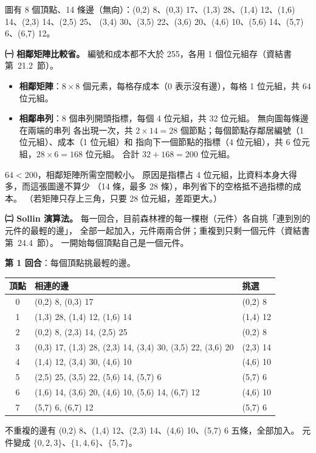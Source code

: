\begin{pastsoln}
圖有 8 個頂點、14 條邊（無向）：(0,2) 8、(0,3) 17、(1,3) 28、(1,4) 12、(1,6) 14、(2,3) 14、(2,5) 25、
(3,4) 30、(3,5) 22、(3,6) 20、(4,6) 10、(5,6) 14、(5,7) 6、(6,7) 12。

\textbf{㈠ 相鄰矩陣比較省。} 編號和成本都不大於 255，各用 1 個位元組存（資結書第~21.2~節）。
\begin{itemize}
\item \textbf{相鄰矩陣}：$8 \times 8$ 個元素，每格存成本（0 表示沒有邊），每格 1 位元組，共
$64$ 位元組。
\item \textbf{相鄰串列}：8 個串列開頭指標，每個 4 位元組，共 32 位元組。 無向圖每條邊在兩端的串列
各出現一次，共 $2 \times 14 = 28$ 個節點；每個節點存鄰居編號（1 位元組）、成本（1 位元組）和
指向下一個節點的指標（4 位元組），共 6 位元組，$28 \times 6 = 168$ 位元組。 合計 $32 + 168 = 200$
位元組。
\end{itemize}
$64 < 200$，相鄰矩陣所需空間較小。 原因是指標占 4 位元組，比資料本身大得多，而這張圖邊不算少
（14 條，最多 28 條），串列省下的空格抵不過指標的成本。 （若矩陣只存上三角，只要 28 位元組，差距更大。）

\textbf{㈡ Sollin 演算法。} 每一回合，目前森林裡的每一棵樹（元件）各自挑「連到別的元件的最輕的邊」，
全部一起加入，元件兩兩合併；重複到只剩一個元件（資結書第~24.4~節）。 一開始每個頂點自己是一個元件。

\textbf{第 1 回合}：每個頂點挑最輕的邊。
\begin{center}
\begin{tabular}{cll}
\toprule
頂點 & 相連的邊 & 挑選 \\
\midrule
0 & (0,2) 8, (0,3) 17 & (0,2) 8 \\
1 & (1,3) 28, (1,4) 12, (1,6) 14 & (1,4) 12 \\
2 & (0,2) 8, (2,3) 14, (2,5) 25 & (0,2) 8 \\
3 & (0,3) 17, (1,3) 28, (2,3) 14, (3,4) 30, (3,5) 22, (3,6) 20 & (2,3) 14 \\
4 & (1,4) 12, (3,4) 30, (4,6) 10 & (4,6) 10 \\
5 & (2,5) 25, (3,5) 22, (5,6) 14, (5,7) 6 & (5,7) 6 \\
6 & (1,6) 14, (3,6) 20, (4,6) 10, (5,6) 14, (6,7) 12 & (4,6) 10 \\
7 & (5,7) 6, (6,7) 12 & (5,7) 6 \\
\bottomrule
\end{tabular}
\end{center}
不重複的邊有 (0,2) 8、(1,4) 12、(2,3) 14、(4,6) 10、(5,7) 6 五條，全部加入。 元件變成
$\{0, 2, 3\}$、$\{1, 4, 6\}$、$\{5, 7\}$。


\end{pastsoln}
